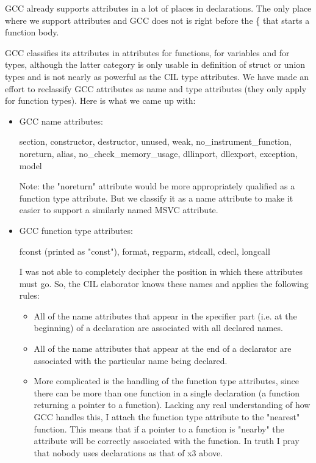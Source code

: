 \documentclass{article}
\begin{document}
 GCC already supports attributes in a lot of places in declarations. The only
place where we support attributes and GCC does not is right before the \{ that
starts a function body. 

 GCC classifies its attributes in attributes for functions, for variables and
for types, although the latter category is only usable in definition of struct
or union types and is not nearly as powerful as the CIL type attributes. We
have made an effort to reclassify GCC attributes as name and type attributes
(they only apply for function types). Here is what we came up with:

\begin{itemize}
  \item GCC name attributes:
   
   section, constructor, destructor, unused, weak, no\_instrument\_function,
   noreturn, alias, no\_check\_memory\_usage, dllinport, dllexport, exception,
   model

      Note: the "noreturn" attribute would be more appropriately qualified as a
      function type attribute. But we classify it as a name attribute to make
      it easier to support a similarly named MSVC attribute. 
  
  \item GCC function type attributes:

    fconst (printed as "const"), format, regparm, stdcall,
    cdecl, longcall

  I was not able to completely decipher the position in which these attributes
  must go. So, the CIL elaborator knows these names and applies the following
  rules: 
  \begin{itemize}
  \item All of the name attributes that appear in the specifier part (i.e. at
  the beginning) of a declaration are associated with all declared names. 

  \item All of the name attributes that appear at the end of a declarator are
  associated with the particular name being declared.

  \item More complicated is the handling of the function type attributes, since
     there can be more than one function in a single declaration (a function
     returning a pointer to a function). Lacking any real understanding of how
     GCC handles this, I attach the function type attribute to the "nearest"
     function. This means that if a pointer to a function is "nearby" the
     attribute will be correctly associated with the function. In truth I pray
     that nobody uses declarations as that of x3 above. 
  \end{itemize}
\end{itemize}
\end{document}
